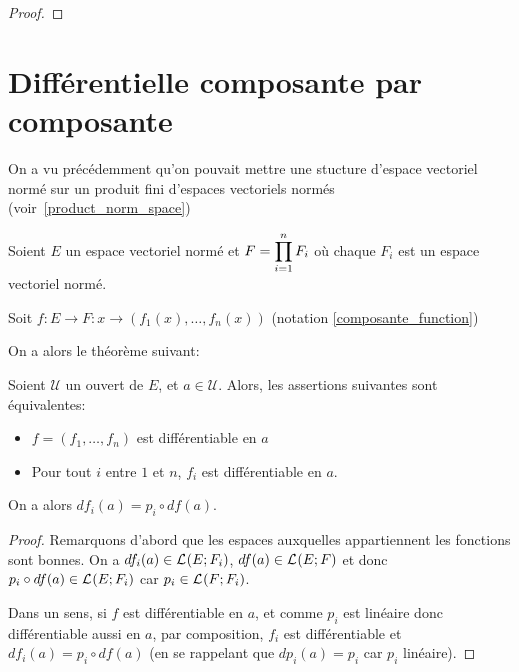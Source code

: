 \ifdefined\outputproof
\begin{proof}

\end{proof}
\fi

\section{Différentielle composante par composante}
\label{section_differential_composante}


On a vu précédemment qu'on pouvait mettre une stucture d'espace vectoriel
normé sur un produit fini d'espaces vectoriels normés (voir~\ref{product_norm_space})

Soient $E$ un espace vectoriel normé et $F = \displaystyle \prod_{i = 1}^{n} F_{i}$ où chaque
$F_{i}$ est un espace vectoriel normé.

Soit $f : E \rightarrow F : x \rightarrow (f_{1}(x), \ldots, f_{n}(x))$
(notation \ref{composante_function})

On a alors le théorème suivant:

\begin{theorem}
	\label{differential_composante}
	Soient $\mathcal{U}$ un ouvert de $E$, et $a \in \mathcal{U}$. Alors, les
	assertions suivantes sont équivalentes:

	\begin{itemize}
		\item $f = (f_{1}, \ldots, f_{n})$ est différentiable en $a$
		\item Pour tout $i$ entre $1$ et $n$, $f_{i}$ est différentiable en $a$.
	\end{itemize}

	On a alors $df_{i}(a) = p_{i} \circ df(a)$.
\end{theorem}

\ifdefined\outputproof
\begin{proof}
	Remarquons d'abord que les espaces auxquelles appartiennent les fonctions
	sont bonnes. On a $df_{i}(a) \in \mathcal{L}_{}(E; F_{i})$, $df(a) \in
	\mathcal{L}_{}(E; F)$ et donc $p_{i} \circ df(a) \in
	\mathcal{L}_{}(E; F_{i})$ car $p_{i} \in
	\mathcal{L}_{}(F; F_{i})$.

	Dans un sens, si $f$ est différentiable en $a$, et comme $p_{i}$ est
	linéaire donc différentiable aussi en $a$, par composition, $f_{i}$ est
	différentiable et $df_{i}(a) = p_{i} \circ df(a)$ (en se rappelant que
	$dp_{i}(a) = p_{i}$ car $p_{i}$ linéaire).
\end{proof}
\fi

